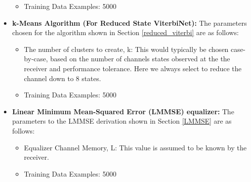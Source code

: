 \begin{itemize}
\begin{itemize}
\item Training Data Examples: 5000
\end{itemize}
\item \textbf{k-Means Algorithm (For Reduced State ViterbiNet):} The parameters chosen for the algorithm shown in  Section \ref{reduced_viterbi} are as follows:
\begin{itemize}
\item The number of clusters to create, k: This would typically be chosen case-by-case, based on the number of channels states observed at the the receiver and performance tolerance. Here we always select to reduce the channel down to 8 states.
\item Training Data Examples: 5000
\end{itemize}
\item \textbf{Linear Minimum Mean-Squared Error (LMMSE) equalizer:} The parameters to the LMMSE derivation shown in Section \ref{LMMSE} are as follows:
\begin{itemize}
\item Equalizer Channel Memory, L: This value is assumed to be known by the receiver. 
\item Training Data Examples: 5000

\end{itemize}

\end{itemize}


